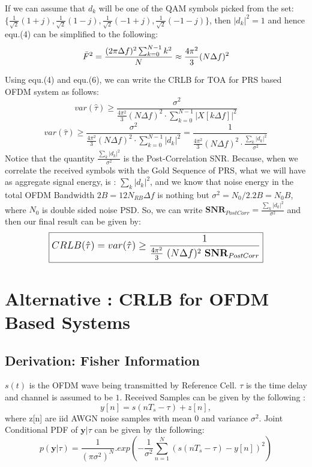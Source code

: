 \documentclass{article}
\begin{document}
If we can assume that $d_k$ will be one of the QAM symbols picked from the set: $\{ \frac{1}{\sqrt{2}} (1+j) , \frac{1}{\sqrt{2}} (1-j), \frac{1}{\sqrt{2}} (-1+j), \frac{1}{\sqrt{2}} (-1-j) \}$, then $|d_k|^2 = 1$ and hence equ.(4) can be simplified to the following:
\begin{equation} \label{eq6} \large
\bar{F}^2 = \frac{(2\pi \Delta f)^2 \sum^{N-1}_{k=0}k^2}{N} \approx  \frac{4\pi^2}{3}(N\Delta f)^2
\end{equation}

Using equ.(4) and equ.(6), we can write the CRLB for TOA for PRS based OFDM system as follows:
$$var(\hat{\tau}) \ge \frac{\sigma^2}{\frac{4\pi^2}{3}(N\Delta f)^2 \cdot \sum^{N-1}_{k=0}|X[k\Delta f]|^2}$$ $$ var(\hat{\tau}) \ge \frac{\sigma^2}{\frac{4\pi^2}{3}(N\Delta f)^2 \cdot \sum^{N-1}_{k=0}|d_k|^2} = \frac{1}{\frac{4\pi^2}{3}(N\Delta f)^2 \cdot \frac{\sum_{k}|d_k|^2}{\sigma^2}}$$
Notice that the quantity $\frac{\sum_{k}|d_k|^2}{\sigma^2}$ is the Post-Correlation SNR. Because, when we correlate the received symbols with the Gold Sequence of PRS, what we will have as aggregate signal energy, is : $\sum_{k}|d_k|^2$, and we know that noise energy in the total OFDM Bandwidth $2B = 12N_{RB}\Delta f$ is nothing but $\sigma^2 = N_0/2.2B = N_0B$, where $N_0$ is double sided noise PSD. So, we can write $\mathbf{SNR}_{PostCorr} = \frac{\sum_{k}|d_k|^2}{\sigma^2}$ and then our final result can be given by:
\begin{equation} \label{eq7}
\large
\boxed{CRLB(\hat{\tau}) = var(\hat{\tau}) \ge \frac{1}{\frac{4\pi^2}{3} \ (N\Delta f)^2 \ \mathbf{SNR}_{PostCorr}} }
\end{equation}

\newpage
\section{Alternative : CRLB for OFDM Based Systems}
\subsection{Derivation: Fisher Information}
$s(t)$ is the OFDM wave being transmitted by Reference Cell. $\tau$ is the time delay and channel is assumed to be $1$. Received Samples can be given by the following :$$y[n] = s(nT_s - \tau) + z[n],$$where z[n] are iid AWGN noise samples with mean $0$ and variance $\sigma^2$.  
Joint Conditional PDF of $\mathbf y|\tau$ can be given by the following:
$$p(\mathbf y|\tau) = \frac{1}{(\pi \sigma^2)^N} .exp(-\frac{1}{\sigma^2}\sum^{N}_{n=1}(s(n T_s - \tau) - y[n])^2)$$
\end{document}
